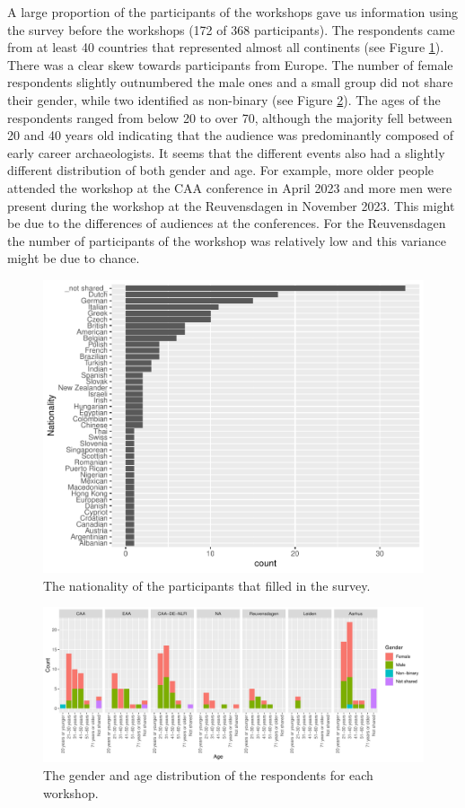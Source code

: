 \documentclass[
]{article}
\begin{document}
A large proportion of the participants of the workshops gave us information using the survey before the workshops (172 of 368 participants). The respondents came from at least 40 countries that represented almost all continents (see Figure \ref{fig:nationality}). There was a clear skew towards participants from Europe. The number of female respondents slightly outnumbered the male ones and a small group did not share their gender, while two identified as non-binary (see Figure \ref{fig:gender-age}). The ages of the respondents ranged from below 20 to over 70, although the majority fell between 20 and 40 years old indicating that the audience was predominantly composed of early career archaeologists. It seems that the different events also had a slightly different distribution of both gender and age. For example, more older people attended the workshop at the CAA conference in April 2023 and more men were present during the workshop at the Reuvensdagen in November 2023. This might be due to the differences of audiences at the conferences. For the Reuvensdagen the number of participants of the workshop was relatively low and this variance might be due to chance.

\begin{figure}
\centering
\includegraphics{paper_files/figure-latex/nationality-1.pdf}
\caption{\label{fig:nationality}The nationality of the participants that filled in the survey.}
\end{figure}

\begin{figure}
\centering
\includegraphics{paper_files/figure-latex/gender-age-1.pdf}
\caption{\label{fig:gender-age}The gender and age distribution of the respondents for each workshop.}
\end{figure}
\end{document}
